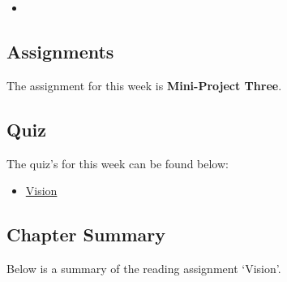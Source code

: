 \begin{itemize}
    \item {}
\end{itemize}

\subsection{Assignments}

The assignment for this week is \textbf{Mini-Project Three}.  

\subsection{Quiz}

The quiz's for this week can be found below:

\begin{itemize}
    \item \href{https://applied.cs.colorado.edu/mod/quiz/view.php?id=49380}{Vision}  
\end{itemize}

\subsection{Chapter Summary}

Below is a summary of the reading assignment `Vision'.

